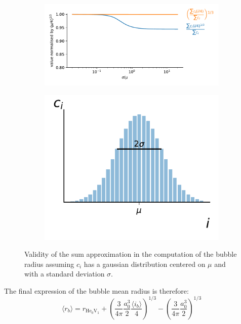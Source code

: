 \begin{figure}
    \begin{subfigure}{0.75\linewidth}
        \includegraphics[width=\linewidth]{Figures/Chapter5/comparison_sum_of_powers_power_of_sums.pdf}
    \end{subfigure}%
    \begin{subfigure}{0.25\linewidth}
        \includegraphics[width=\linewidth]{Figures/Chapter5/gaussian_representation.pdf}
    \end{subfigure}
    \caption{Validity of the sum approximation in the computation of the bubble radius assuming $c_i$ has a gaussian distribution centered on $\mu$ and with a standard deviation $\sigma$.}
\end{figure}


The final expression of the bubble mean radius is therefore:
\begin{equation}
    \langle r_b \rangle = r_{\mathrm{He}_0 \mathrm{V}_1} + \left(\frac{3}{4 \pi} \frac{a_0^3}{2} \frac{\langle i_b \rangle}{4} \right)^{1/3} - \left(\frac{3}{4 \pi} \frac{a_0^3}{2} \right)^{1/3}
\end{equation}

